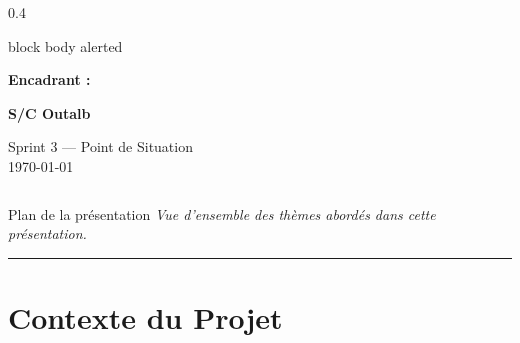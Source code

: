 \documentclass[
  aspectratio=169,       %
  xcolor=dvipsnames,     %
  t                      %
]{beamer}
\newcommand{\framedesc}[1]{%
  {\small\itshape\textcolor{PrimaryDark!80}{#1}}\par%
  \vspace{1pt}%
  {\color{PrimaryMid}\rule{\textwidth}{0.4pt}}%
  \vspace{4pt}%
}
\newcommand{\encadrant}{S/C Outalb}
\begin{document}
{\begin{frame}
\begin{columns}[b]
      \begin{column}{0.4\textwidth}
        \begin{beamercolorbox}[sep=10pt, center, rounded=true]{block body alerted}
          {\small\textbf{Encadrant :}\par}
          \vspace{0.2cm}
          \textbf{\encadrant}
        \end{beamercolorbox}
        \vspace{0.6cm}
        \begin{flushright}
          \small Sprint 3 --- Point de Situation \\
          \today
        \end{flushright}
      \end{column}
    \end{columns}
  \end{frame}
}

\begin{frame}{Plan de la présentation}
  \framedesc{Vue d'ensemble des thèmes abordés dans cette présentation.}
  \tableofcontents[hideallsubsections]
\end{frame}

\section{Contexte du Projet}
\end{document}
